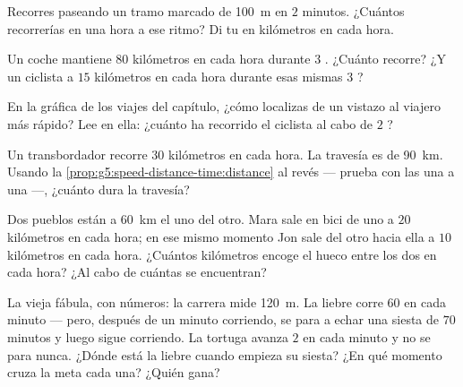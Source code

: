 \begin{exercise}[$\star$]\label{exo:g5:speed-distance-time:6}
Recorres paseando un tramo marcado de \qty{100}{m} en $2$ minutos.
¿Cuántos  recorrerías en una hora a ese ritmo? Di tu
 en kilómetros en cada hora.
\end{exercise}

\begin{exercise}[$\star$]\label{exo:g5:speed-distance-time:7}
Un coche mantiene $80$ kilómetros en cada hora durante $3$
. ¿Cuánto recorre? ¿Y un ciclista a $15$ kilómetros en cada
hora durante esas mismas $3$ ?
\end{exercise}

\begin{exercise}[$\star$]\label{exo:g5:speed-distance-time:8}
En la gráfica de los viajes del capítulo, ¿cómo localizas de un
vistazo al viajero más rápido? Lee en ella: ¿cuánto ha recorrido el
ciclista al cabo de $2$ ?
\end{exercise}

\begin{exercise}[$\star\star$]\label{exo:g5:speed-distance-time:9}
Un transbordador recorre $30$ kilómetros en cada hora. La travesía es
de \qty{90}{km}. Usando la \cref{prop:g5:speed-distance-time:distance}
al revés --- prueba con las  una a una ---, ¿cuánto dura la
travesía?
\end{exercise}

\begin{exercise}[$\star\star$]\label{exo:g5:speed-distance-time:10}
Dos pueblos están a \qty{60}{km} el uno del otro. Mara sale en bici de
uno a $20$ kilómetros en cada hora; en ese mismo momento Jon sale del
otro hacia ella a $10$ kilómetros en cada hora. ¿Cuántos kilómetros
encoge el hueco entre los dos en cada hora? ¿Al cabo de cuántas
 se encuentran?
\end{exercise}

\begin{exercise}[$\star\star$]\label{exo:g5:speed-distance-time:11}
La vieja fábula, con números: la carrera mide \qty{120}{m}. La liebre
corre $60$  en cada minuto --- pero, después de un minuto
corriendo, se para a echar una siesta de $70$ minutos y luego sigue
corriendo. La tortuga avanza $2$  en cada minuto y no se para
nunca. ¿Dónde está la liebre cuando empieza su siesta? ¿En qué momento
cruza la meta cada una? ¿Quién gana?
\end{exercise}
